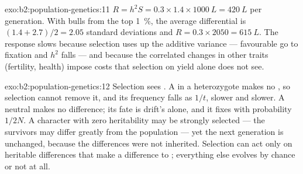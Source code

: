 \begin{solution}{exo:b2:population-genetics:11}
$R = h^{2}S = 0.3\times 1.4\times \qty{1000}{L} = \qty{420}{L}$ per
generation. With bulls from the top \qty{1}{\%}, the average
differential is $(1.4 + 2.7)/2 = 2.05$ standard deviations and $R =
0.3\times 2050 = \qty{615}{L}$. The response slows because selection
uses up the additive variance --- favourable  go to fixation
and $h^{2}$ falls --- and because the correlated changes in other
traits (fertility, health) impose costs that selection on yield
alone does not see.
\end{solution}

\begin{solution}{exo:b2:population-genetics:12}
Selection sees . A   in a heterozygote
makes no , so selection cannot remove it, and its
frequency falls as $1/t$, slower and slower. A neutral 
makes no  difference; its fate is drift's alone, and it
fixes with probability $1/2N$. A character with zero heritability
may be strongly selected --- the survivors may differ greatly from
the population --- yet the next generation is unchanged, because
the differences were not inherited. Selection can act only on
heritable differences that make a difference to ; everything
else evolves by chance or not at all.
\end{solution}

